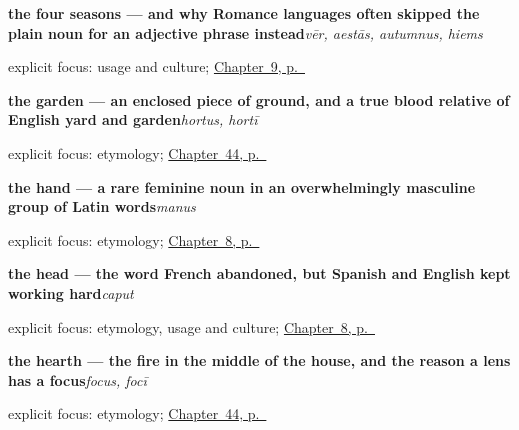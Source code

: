 \noindent\begin{minipage}[t]{\linewidth}
\raggedright
\textbf{the four seasons — and why Romance languages often skipped the plain noun for an adjective phrase instead}\enspace\emph{vēr, aestās, autumnus, hiems}\par
\footnotesize explicit focus: usage and culture; \hyperref[ch:la-seasons]{Chapter~9, p.~\pageref*{ch:la-seasons}}
\end{minipage}\par\smallskip

\noindent\begin{minipage}[t]{\linewidth}
\raggedright
\textbf{the garden — an enclosed piece of ground, and a true blood relative of English yard and garden}\enspace\emph{hortus, hortī}\par
\footnotesize explicit focus: etymology; \hyperref[ch:la-domus]{Chapter~44, p.~\pageref*{ch:la-domus}}
\end{minipage}\par\smallskip

\noindent\begin{minipage}[t]{\linewidth}
\raggedright
\textbf{the hand — a rare feminine noun in an overwhelmingly masculine group of Latin words}\enspace\emph{manus}\par
\footnotesize explicit focus: etymology; \hyperref[ch:la-head-and-hand]{Chapter~8, p.~\pageref*{ch:la-head-and-hand}}
\end{minipage}\par\smallskip

\noindent\begin{minipage}[t]{\linewidth}
\raggedright
\textbf{the head — the word French abandoned, but Spanish and English kept working hard}\enspace\emph{caput}\par
\footnotesize explicit focus: etymology, usage and culture; \hyperref[ch:la-head-and-hand]{Chapter~8, p.~\pageref*{ch:la-head-and-hand}}
\end{minipage}\par\smallskip

\noindent\begin{minipage}[t]{\linewidth}
\raggedright
\textbf{the hearth — the fire in the middle of the house, and the reason a lens has a focus}\enspace\emph{focus, focī}\par
\footnotesize explicit focus: etymology; \hyperref[ch:la-domus]{Chapter~44, p.~\pageref*{ch:la-domus}}
\end{minipage}\par\smallskip

